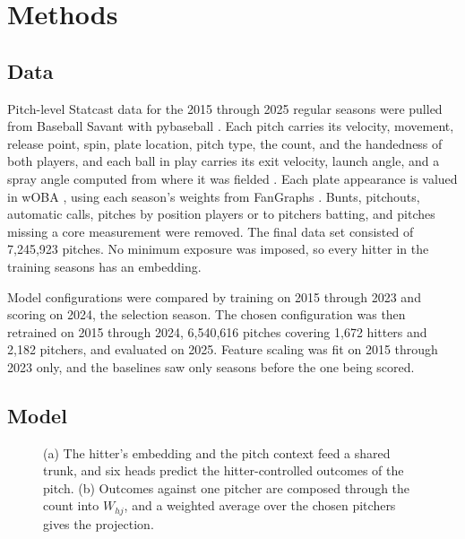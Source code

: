 \documentclass[11pt,letterpaper]{article}
\let\oldsubsection\subsection
\renewcommand\subsection{\FloatBarrier\oldsubsection}
\begin{document}
\section{Methods}
\label{sec:methods}

\subsection{Data}
\label{sec:data}

Pitch-level Statcast data for the 2015 through 2025 regular seasons were pulled from Baseball Savant \citep{savant} with pybaseball \citep{pybaseball}. Each pitch carries its velocity, movement, release point, spin, plate location, pitch type, the count, and the handedness of both players, and each ball in play carries its exit velocity, launch angle, and a spray angle computed from where it was fielded \citep{albert2024}. Each plate appearance is valued in wOBA \citep{tango2007}, using each season's weights from FanGraphs \citep{fangraphsguts}. Bunts, pitchouts, automatic calls, pitches by position players or to pitchers batting, and pitches missing a core measurement were removed. The final data set consisted of 7,245,923 pitches. No minimum exposure was imposed, so every hitter in the training seasons has an embedding.

Model configurations were compared by training on 2015 through 2023 and scoring on 2024, the selection season. The chosen configuration was then retrained on 2015 through 2024, 6,540,616 pitches covering 1,672 hitters and 2,182 pitchers, and evaluated on 2025. Feature scaling was fit on 2015 through 2023 only, and the baselines saw only seasons before the one being scored.

\subsection{Model}
\label{sec:model}

\begin{figure}[!ht]
\centering

\caption{(a) The hitter's embedding and the pitch context feed a shared trunk, and six heads predict the hitter-controlled outcomes of the pitch. (b) Outcomes against one pitcher are composed through the count into $W_{hj}$, and a weighted average over the chosen pitchers gives the projection.}
\label{fig:arch}
\end{figure}
\end{document}

